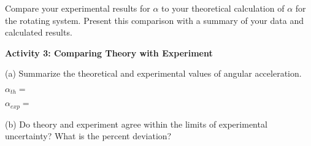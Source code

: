 \newpage

Compare your experimental results for \( \alpha \) to your theoretical calculation of \( \alpha \) for the rotating system. Present this comparison with a summary of your data and calculated results.

\textbf{Activity 3: Comparing Theory with Experiment }

(a) Summarize the theoretical and experimental values of angular acceleration.
\vspace{5mm}

\( \alpha _{th}= \)
\vspace{5mm}

\( \alpha _{exp}= \) 
\vspace{15mm}

(b) Do theory and experiment agree within the limits of experimental uncertainty?
What is the percent deviation?

